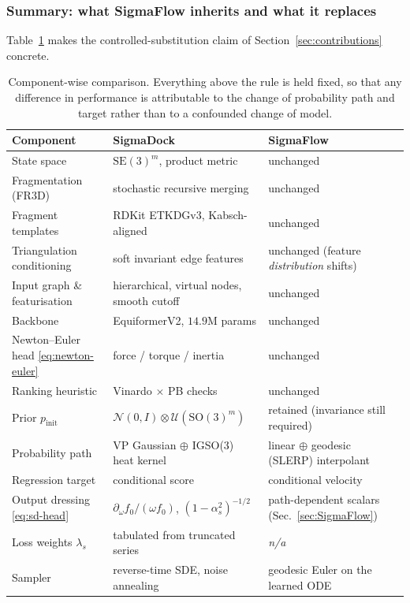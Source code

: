 \documentclass[a4paper,12pt]{article}
\theoremstyle{remark}
\begin{document}
\subsubsection{Summary: what SigmaFlow inherits and what it replaces}

Table~\ref{tab:sigmadock-vs-sigmaflow} makes the controlled-substitution claim of
Section~\ref{sec:contributions} concrete.

\begin{table}[t]
\centering
\small
\begin{tabular}{@{}lll@{}}
\toprule
\textbf{Component} & \textbf{SigmaDock} & \textbf{SigmaFlow} \\
\midrule
State space & $\mathrm{SE}(3)^m$, product metric & unchanged \\
Fragmentation (FR3D) & stochastic recursive merging & unchanged \\
Fragment templates & RDKit ETKDGv3, Kabsch-aligned & unchanged \\
Triangulation conditioning & soft invariant edge features & unchanged (feature \emph{distribution} shifts) \\
Input graph \& featurisation & hierarchical, virtual nodes, smooth cutoff & unchanged \\
Backbone & EquiformerV2, $14.9\mathrm{M}$ params & unchanged \\
Newton--Euler head \eqref{eq:newton-euler} & force / torque / inertia & unchanged \\
Ranking heuristic & Vinardo $\times$ PB checks & unchanged \\
\midrule
Prior $p_{\mathrm{init}}$ & $\mathcal{N}(0,I) \otimes \mathcal{U}(\mathrm{SO}(3)^m)$ & retained (invariance still required) \\
Probability path & VP Gaussian $\oplus$ IGSO(3) heat kernel & linear $\oplus$ geodesic (SLERP) interpolant \\
Regression target & conditional score & conditional velocity \\
Output dressing \eqref{eq:sd-head} & $\partial_\omega f_0 / (\omega f_0)$, $(1-\alpha_s^2)^{-1/2}$ & path-dependent scalars (Sec.~\ref{sec:SigmaFlow}) \\
Loss weights $\lambda_s$ & tabulated from truncated series & \emph{n/a} \\
Sampler & reverse-time SDE, noise annealing & geodesic Euler on the learned ODE \\
\bottomrule
\end{tabular}
\caption{Component-wise comparison. Everything above the rule is held fixed, so that any difference
in performance is attributable to the change of probability path and target rather than to a
confounded change of model.}
\label{tab:sigmadock-vs-sigmaflow}
\end{table}
\end{document}
